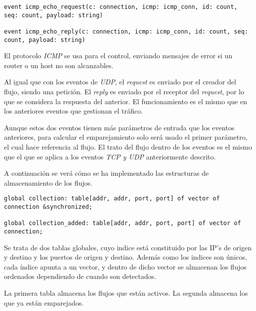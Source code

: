\begin{lstlisting}[style=CodigoC]
event icmp_echo_request(c: connection, icmp: icmp_conn, id: count, seq: count, payload: string)

event icmp_echo_reply(c: connection, icmp: icmp_conn, id: count, seq: count, payload: string)
\end{lstlisting}

\intro El protocolo \textit{ICMP} se usa para el control, enviando mensajes de error si un router o un host 
no son alcanzables.

\intro Al igual que con los eventos de \textit{UDP}, el \textit{request} es enviado por el creador del flujo, 
siendo una petición. El \textit{reply} es enviado por el receptor del \textit{request}, por lo que se considera 
la respuesta del anterior. El funcionamiento es el mismo que en los anteriores eventos que gestionan el tráfico.

\intro Aunque estos dos eventos tienen más parámetros de entrada que los eventos anteriores, para calcular el 
emparejamiento solo será usado el primer parámetro, el cual hace referencia al flujo. El trato del flujo dentro 
de los eventos es el mismo que el que se aplica a los eventos \textit{TCP y UDP} anteriormente descrito.

\intro A continuación se verá cómo se ha implementado las estructuras de almacenamiento de los flujos.

\begin{lstlisting}[style=CodigoC]
global collection: table[addr, addr, port, port] of vector of connection &synchronized;

global collection_added: table[addr, addr, port, port] of vector of connection;
\end{lstlisting}

\intro Se trata de dos tablas globales, cuyo indice está constituido por las IP's de origen y destino y los 
puertos de origen y destino. Además como los indices son únicos, cada índice apunta a un vector, y dentro de 
dicho vector se almacenan los flujos ordenados dependiendo de cuando son detectados.

\intro La primera tabla almacena los flujos que están activos. La segunda almacena los que ya están emparejados.



